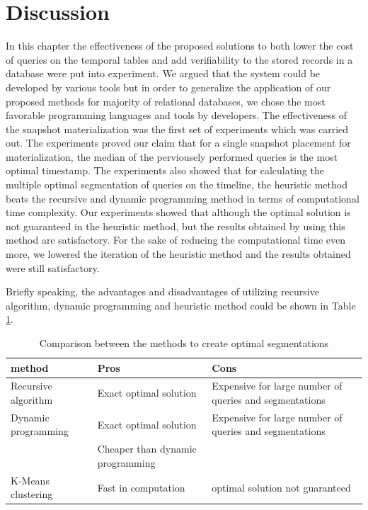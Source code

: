 		\section{Discussion}
			In this chapter the effectiveness of the proposed solutions to both lower the cost of queries on the temporal tables and add verifiability to the stored records in a database were put into experiment. We argued that the system could be developed by various tools but in order to generalize the application of our proposed methods for majority of relational databases, we chose the most favorable programming languages and tools by developers.
			The effectiveness of the snapshot materialization was the first set of experiments which was carried out. The experiments proved our claim that for a single snapshot placement for materialization, the median of the perviousely performed queries is the most optimal timestamp. The experiments also showed that for calculating the multiple optimal segmentation of queries on the timeline, the heuristic method beats the recursive and dynamic programming method in terms of computational time complexity. Our experiments showed that although the optimal solution is not guaranteed in the heuristic method, but the results obtained by using this method are satisfactory. For the sake of reducing the computational time even more, we lowered the iteration of the heuristic method and the results obtained were still satisfactory.

			Briefly speaking, the advantages and disadvantages of utilizing recursive algorithm, dynamic programming and heuristic method could be shown in Table \ref{table:segmentation_comparison}. 
			\begin{center}
				\begin{table}
					\centering
					\small
					\caption{Comparison between the methods to create optimal segmentations}
					\label{table:segmentation_comparison}
					\begin{tabular}{p{4cm}p{4cm}p{4cm}}
						\hline
						method & Pros  & Cons  \\ \hline
						Recursive algorithm & Exact optimal solution & Expensive for large number of queries and segmentations   \\ \hline
						Dynamic programming & Exact optimal solution & Expensive for large number of queries and segmentations\\ 
						  & Cheaper than dynamic programming &    \\ \hline
						K-Means clustering & Fast in computation & optimal solution not guaranteed \\ \hline
					\end{tabular}
				\end{table}
			\end{center}
			